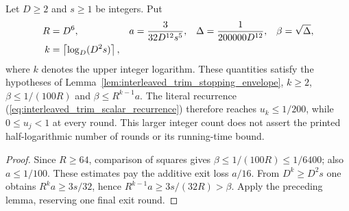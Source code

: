 \begin{lemma}
    \label{lem:interleaved_actual_stopping_parameters}
    \leanok
    Let $D\ge2$ and $s\ge1$ be integers. Put
    \begin{align}
        R      & =D^6,                                 & a     & =\frac{3}{32D^{12}s^5}, &
        \Delta & =\frac{1}{200000D^{12}},              & \beta & =\sqrt\Delta,\notag       \\
        k      & =\left\lceil\log_D(D^2s)\right\rceil,
        \label{eq:interleaved_actual_stopping_count}
    \end{align}
    where $k$ denotes the upper integer logarithm. These quantities
    satisfy the hypotheses of Lemma~\ref{lem:interleaved_trim_stopping_envelope},
    $k\ge2$, $\beta\le1/(100R)$ and $\beta\le R^{k-1}a$.
    The literal recurrence (\ref{eq:interleaved_trim_scalar_recurrence})
    therefore reaches $u_k\le1/200$, while $0\le u_j<1$ at every round.
    This larger integer count does not assert the printed half-logarithmic
    number of rounds or its running-time bound.
\end{lemma}
\begin{proof}\leanok
    Since $R\ge64$, comparison of squares gives
    $\beta\le1/(100R)\le1/6400$; also $a\le1/100$.
    These estimates pay the additive exit loss $a/16$.
    From $D^k\ge D^2s$ one obtains
    $R^ka\ge3s/32$, hence
    $R^{k-1}a\ge3s/(32R)>\beta$.
    Apply the preceding lemma, reserving one final exit round.
\end{proof}
